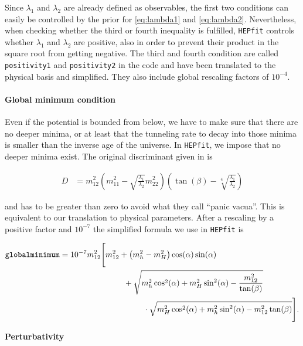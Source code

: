 \documentclass[preprint,3p,12pt]{elsarticle}
\newcommand{\HEPfit}{\texttt{HEPfit}\xspace}
\begin{document}
Since $\lambda_1$ and $\lambda_2$ are already defined as observables, the first two conditions can easily be controlled by the prior for \eqref{eq:lambda1} and \eqref{eq:lambda2}. Nevertheless, when checking whether the third or fourth inequality is fulfilled, \HEPfit controls whether $\lambda_1$ and $\lambda_2$ are positive, also in order to prevent their product in the square root from getting negative. The third and fourth condition are called {\tt positivity1} and {\tt positivity2} in the code and have been translated to the physical basis and simplified. They also include global rescaling factors of $10^{-4}$.\\

\paragraph{Global minimum condition}

Even if the potential is bounded from below, we have to make sure that there are no deeper minima, or at least that the tunneling rate to decay into those minima is smaller than the inverse age of the universe. In \HEPfit, we impose that no deeper minima exist.
The original discriminant given in \cite{Barroso:2013awa} is

\begin{align}
 D&=m_{12}^2 \left( m_{11}^2 - \sqrt{\frac{\lambda_1}{\lambda_2}}m_{22}^2 \right) \left( \tan(\beta ) -\sqrt[4]{\frac{\lambda_1}{\lambda_2}}\right) \nonumber
\end{align}

and has to be greater than zero to avoid what they call ``panic vacua''. This is equivalent to our translation to physical parameters. After a rescaling by a positive factor and $10^{-7}$ the simplified formula we use in \HEPfit is

\begin{align}
 \tt{globalminimum} &= 10^{-7} m_{12}^2 \Bigg[ m_{12}^2 + \left( m_h^2 - m_H^2 \right) \cos (\alpha) \sin (\alpha) \phantom{Bigg]} \nonumber \\
 & \hspace*{80pt} +\sqrt{ m_h^2 \cos^2(\alpha) +m_H^2 \sin^2(\alpha) - \frac{m_{12}^2}{\tan(\beta)} } \nonumber \\
 & \hspace*{80pt} \phantom{Bigg[} \cdot \sqrt{ m_H^2 \cos^2(\alpha) +m_h^2 \sin^2(\alpha) -m_{12}^2 \tan (\beta ) } \Bigg] .\nonumber
\end{align}

\textbf{Perturbativity}\\
\end{document}
